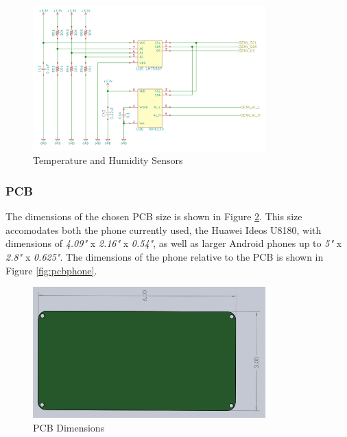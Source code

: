 \documentclass{article}
\numberwithin{figure}{section}
\numberwithin{equation}{section}
\begin{document}
{\begin{figure}[H]
	\centering
	\includegraphics[width=0.8\textwidth]{temphumid}
	\caption{Temperature and Humidity Sensors}
	\label{fig:tandh}
\end{figure}

\subsubsection{PCB} \label{sect:pcbdesign}
The dimensions of the chosen PCB size is shown in Figure \ref{fig:pcbdimensions}. This size accomodates both the phone currently used, the Huawei Ideos U8180, with dimensions of \textit{4.09"} x \textit{2.16"} x \textit{0.54"}, as well as larger Android phones up to \textit{5"} x \textit{2.8"} x \textit{0.625"}. The dimensions of the phone relative to the PCB is shown in Figure \ref{fig:pcbphone}.

\begin{figure}[H]
	\centering
	\includegraphics[width=0.8\textwidth]{PCB}
	\caption{PCB Dimensions}
	\label{fig:pcbdimensions}
\end{figure}

}
\end{document}
